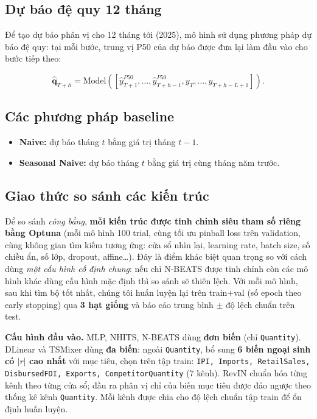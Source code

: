 \documentclass[12pt, a4paper]{report}
\begin{document}
\subsection{Dự báo đệ quy 12 tháng}

Để tạo dự báo phân vị cho 12 tháng tới (2025), mô hình sử dụng phương pháp dự báo đệ quy: tại mỗi bước, trung vị P50 của dự báo được đưa lại làm đầu vào cho bước tiếp theo:

\begin{equation}
  \hat{\mathbf{q}}_{T+h} = \text{Model}\!\left([\hat{y}^{P50}_{T+1}, \ldots, \hat{y}^{P50}_{T+h-1}, y_T, \ldots, y_{T+h-L+1}]\right).
\end{equation}

\subsection{Các phương pháp baseline}

\begin{itemize}
  \item \textbf{Naive:} dự báo tháng $t$ bằng giá trị tháng $t-1$.
  \item \textbf{Seasonal Naive:} dự báo tháng $t$ bằng giá trị cùng tháng năm trước.
\end{itemize}

\subsection{Giao thức so sánh các kiến trúc}
\label{sec:protocol}

Để so sánh \textit{công bằng}, \textbf{mỗi kiến trúc được tinh chỉnh siêu tham số riêng bằng Optuna} (mỗi mô hình 100 trial, cùng tối ưu pinball loss trên validation, cùng không gian tìm kiếm tương ứng: cửa sổ nhìn lại, learning rate, batch size, số chiều ẩn, số lớp, dropout, affine\ldots). Đây là điểm khác biệt quan trọng so với cách dùng \textit{một cấu hình cố định chung}: nếu chỉ N-BEATS được tinh chỉnh còn các mô hình khác dùng cấu hình mặc định thì so sánh sẽ thiên lệch. Với mỗi mô hình, sau khi tìm bộ tốt nhất, chúng tôi huấn luyện lại trên train+val (số epoch theo early stopping) qua \textbf{3 hạt giống} và báo cáo trung bình $\pm$ độ lệch chuẩn trên test.

\textbf{Cấu hình đầu vào.} MLP, NHITS, N-BEATS dùng \textbf{đơn biến} (chỉ \texttt{Quantity}). DLinear và TSMixer dùng \textbf{đa biến}: ngoài \texttt{Quantity}, bổ sung \textbf{6 biến ngoại sinh có $|r|$ cao nhất} với mục tiêu, chọn trên tập train: \texttt{IPI, Imports, RetailSales, DisbursedFDI, Exports, CompetitorQuantity} (7 kênh). RevIN chuẩn hóa từng kênh theo từng cửa sổ; đầu ra phân vị chỉ của biến mục tiêu được đảo ngược theo thống kê kênh \texttt{Quantity}. Mỗi kênh được chia cho độ lệch chuẩn tập train để ổn định huấn luyện.
\end{document}
